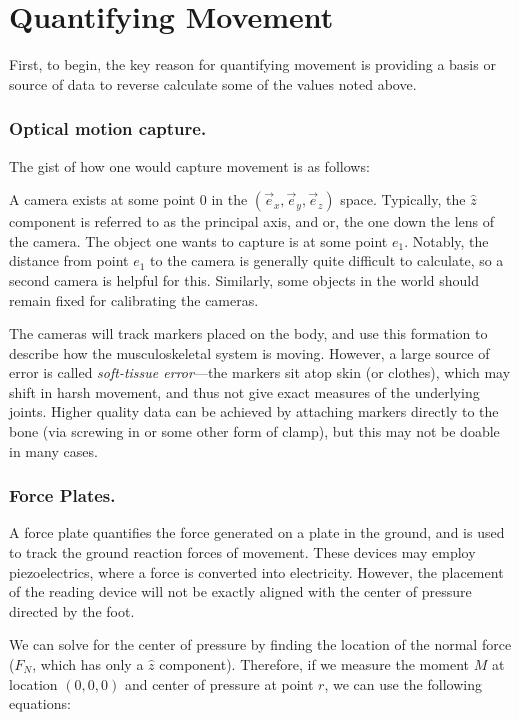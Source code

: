 \section{Quantifying Movement}

First, to begin, the key reason for quantifying movement is providing a basis or source of data to reverse calculate some of the values noted above.  


\subsubsection{Optical motion capture.}

The gist of how one would capture movement is as follows:\newline

A camera exists at some point 0 in the $(\Vec{e}_x, \Vec{e}_y, \Vec{e}_z)$ space. Typically, the $\hat{z}$ component is referred to as the principal axis, and or, the one down the lens of the camera. The object one wants to capture is at some point $e_1$. Notably, the distance from point $e_1$ to the camera is generally quite difficult to calculate, so a second camera is helpful for this. Similarly, some objects in the world should remain fixed for calibrating the cameras.\newline

The cameras will track markers placed on the body, and use this formation to describe how the musculoskeletal system is moving. However, a large source of error is called \textit{soft-tissue error}---the markers sit atop skin (or clothes), which may shift in harsh movement, and thus not give exact measures of the underlying joints. Higher quality data can be achieved by attaching markers directly to the bone (via screwing in or some other form of clamp), but this may not be doable in many cases. 

\subsubsection{Force Plates.}

A force plate quantifies the force generated on a plate in the ground, and is used to track the ground reaction forces of movement. These devices may employ piezoelectrics, where a force is converted into electricity. However, the placement of the reading device will not be exactly aligned with the center of pressure directed by the foot.\newline

We can solve for the center of pressure by finding the location of the normal force ($F_N$, which has only a $\hat{z}$ component). Therefore, if we measure the moment $M$ at location $(0,0,0)$ and center of pressure at point $r$, we can use the following equations: 

